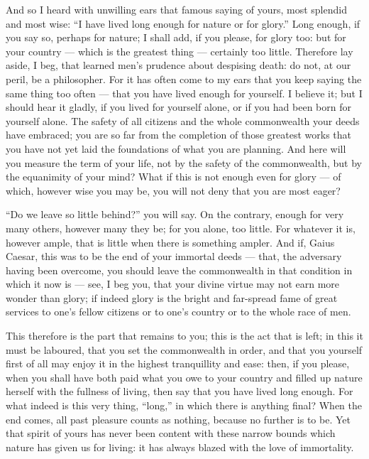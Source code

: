  And so I heard with unwilling ears that famous saying of yours, most splendid and most wise: ``I have lived long enough for nature or for glory.'' Long enough, if you say so, perhaps for nature; I shall add, if you please, for glory too: but for your country --- which is the greatest thing --- certainly too little. Therefore lay aside, I beg, that learned men's prudence about despising death: do not, at our peril, be a philosopher. For it has often come to my ears that you keep saying the same thing too often --- that you have lived enough for yourself. I believe it; but I should hear it gladly, if you lived for yourself alone, or if you had been born for yourself alone. The safety of all citizens and the whole commonwealth your deeds have embraced; you are so far from the completion of those greatest works that you have not yet laid the foundations of what you are planning. And here will you measure the term of your life, not by the safety of the commonwealth, but by the equanimity of your mind? What if this is not enough even for glory --- of which, however wise you may be, you will not deny that you are most eager?

 ``Do we leave so little behind?'' you will say. On the contrary, enough for very many others, however many they be; for you alone, too little. For whatever it is, however ample, that is little when there is something ampler. And if, Gaius Caesar, this was to be the end of your immortal deeds --- that, the adversary having been overcome, you should leave the commonwealth in that condition in which it now is --- see, I beg you, that your divine virtue may not earn more wonder than glory; if indeed glory is the bright and far-spread fame of great services to one's fellow citizens or to one's country or to the whole race of men.

 This therefore is the part that remains to you; this is the act that is left; in this it must be laboured, that you set the commonwealth in order, and that you yourself first of all may enjoy it in the highest tranquillity and ease: then, if you please, when you shall have both paid what you owe to your country and filled up nature herself with the fullness of living, then say that you have lived long enough. For what indeed is this very thing, ``long,'' in which there is anything final? When the end comes, all past pleasure counts as nothing, because no further is to be. Yet that spirit of yours has never been content with these narrow bounds which nature has given us for living: it has always blazed with the love of immortality.

